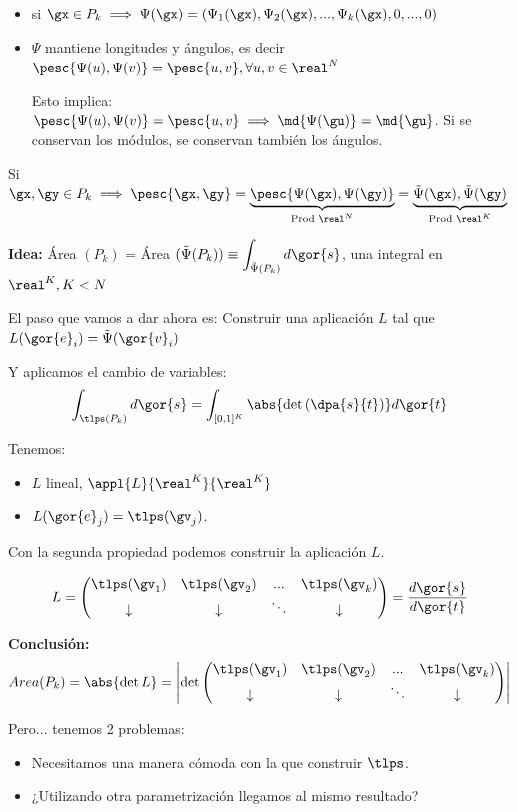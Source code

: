 \begin{itemize}
\item si $\gx \in P_k \implies \Psi(\gx) = (\Psi_1(\gx),\Psi_2(\gx),...,\Psi_k(\gx),0,...,0)$
\item $\Psi$ mantiene longitudes y ángulos, es decir $\pesc{\Psi(u),\Psi(v)}=\pesc{u,v}, \forall u,v\in\real^N$

Esto implica: $\pesc{\Psi(u),\Psi(v)}=\pesc{u,v} \implies \md{\Psi(\gu)} = \md{\gu}$. Si se conservan los módulos, se conservan también los ángulos.
\end{itemize}

\obs Si $\gx,\gy\in P_k \implies \pesc{\gx,\gy} = \underbrace{\pesc{\Psi(\gx),\Psi(\gy)}}_{\text{Prod } \real^N} = \underbrace{{\tilde{\Psi}(\gx),\tilde{\Psi}(\gy)}}_{\text{Prod } \real^K}$


\textbf{Idea:} Área $(P_k)$ = Área $(\tilde{\Psi}(P_k)) \equiv \displaystyle \int_{\tilde{\Psi}(P_k)}d\gor{s}$, una integral en $\real^K, K<N$



El paso que vamos a dar ahora es: Construir una aplicación $L$ tal que $L(\gor{e}_i) = \tilde{\Psi}(\gor{v}_i)$

Y aplicamos el cambio de variables:
\[\int_{\tlps(P_k)} d\gor{s} = \int_{[0,1]^K} \abs{\det\left( \dpa{s}{t} \right)} d\gor{t}\]

Tenemos: 
\begin{itemize}
\item $L$ lineal, $\appl{L}{\real^K}{\real^K}$
\item $L(\gor{e}_j) = \tlps(\gv_j)$.
\end{itemize}
Con la segunda propiedad podemos construir la aplicación $L$.

\begin{gather*}
L = \begin{pmatrix} \tlps(\gv_1) & \tlps(\gv_2) & ... & \tlps(\gv_k)\\
\downarrow & \downarrow & \ddots & \downarrow
\end{pmatrix} = \frac{d\gor{s}}{d\gor{t}}\end{gather*}

\textbf{Conclusión:} \[Area(P_k) = \abs{\det L} = \left|\det \begin{pmatrix}
\tlps(\gv_1) & \tlps(\gv_2) & ... & \tlps(\gv_k)\\
\downarrow & \downarrow & \ddots & \downarrow
\end{pmatrix}\right|\]

Pero... tenemos 2 problemas:
\begin{itemize}
\item Necesitamos una manera cómoda con la que construir $\tlps$.
\item ¿Utilizando otra parametrización llegamos al mismo resultado?
\end{itemize}

